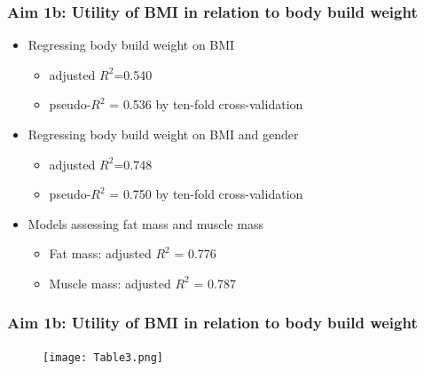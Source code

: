 \documentclass{beamer}
\begin{document}
\begin{frame}
\frametitle{Aim 1b: Utility of BMI in relation to body build weight}

\begin{itemize}
	\item Regressing body build weight on BMI
		\begin{itemize}
			\item adjusted $R^2$=0.540
			\item pseudo-$R^2$ = 0.536 by ten-fold cross-validation
 	
		\end{itemize}
	\item Regressing body build weight on BMI and gender
		\begin{itemize}
			\item adjusted $R^2$=0.748
			\item pseudo-$R^2$ = 0.750 by ten-fold cross-validation
 	
		\end{itemize}
	\item Models assessing fat mass and muscle mass
		\begin{itemize}
			\item Fat mass: adjusted $R^2$ = 0.776
			\item Muscle mass: adjusted $R^2$ = 0.787
 	
		\end{itemize}
\end{itemize}

\end{frame}

\begin{frame}
\frametitle{Aim 1b: Utility of BMI in relation to body build weight}

\begin{figure}
	\texttt{[image: Table3.png]}
	\label{fig:table3}
\end{figure}

\end{frame}
\end{document}
